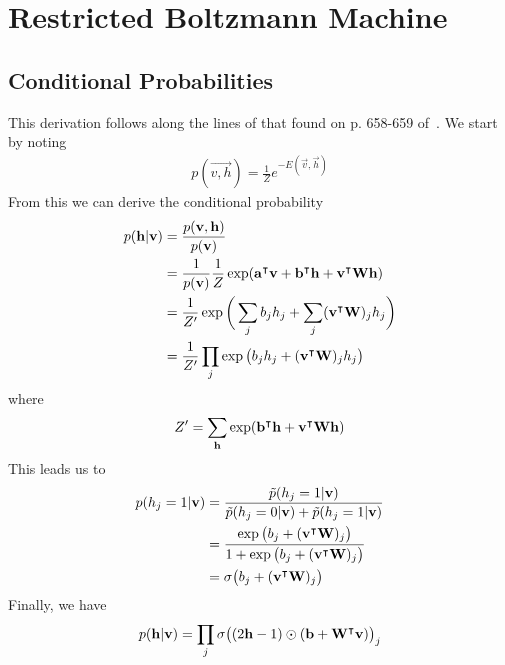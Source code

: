 \section{Restricted Boltzmann Machine}
\subsection{Conditional Probabilities}\label{app:conditional_probabilities_derivation}
This derivation follows along the lines of that found on p. 658-659 of~\cite{goodfellow_deep_learning}.
We start by noting
\begin{align}
    p(\vec{v,h}) = \frac{1}{Z} e^{-E(\vec{v},\vec{h})}
\end{align}
From this we can derive the conditional probability
\begin{align}
\begin{split}
    p(\mathbf{h} | \mathbf{v})
        &= \frac{p(\mathbf{v},\mathbf{h})}{p(\mathbf{v})} \\
        &= \frac{1}{p(\mathbf{v})} \frac{1}{Z} \exp( \mathbf{a}^\intercal\mathbf{v} + \mathbf{b}^\intercal\mathbf{h} + \mathbf{v}^\intercal\mathbf{W}\mathbf{h} ) \\
        &= \frac{1}{Z'} \exp\bigg( \sum_j b_j h_j + \sum_j (\mathbf{v}^\intercal\mathbf{W})_j h_j \bigg) \\
        &= \frac{1}{Z'} \prod_j \exp\big( b_j h_j + (\mathbf{v}^\intercal\mathbf{W})_j h_j \big)
\end{split}
\end{align}
where
\begin{align}
    Z' = \sum_{\mathbf{h}} \exp( \mathbf{b}^\intercal\mathbf{h} + \mathbf{v}^\intercal\mathbf{W}\mathbf{h} )
\end{align}
This leads us to
\begin{align}
\begin{split}
    p(h_j = 1 | \mathbf{v})
        &= \frac{\tilde{p}(h_j = 1 | \mathbf{v})}{\tilde{p}(h_j = 0 | \mathbf{v}) + \tilde{p}(h_j = 1 | \mathbf{v})} \\
        &= \frac{\exp\big( b_j + (\mathbf{v}^\intercal\mathbf{W})_j \big)}{1 + \exp\big( b_j + (\mathbf{v}^\intercal\mathbf{W})_j \big)} \\
        &= \sigma\big( b_j + (\mathbf{v}^\intercal\mathbf{W})_j \big)
\end{split}
\end{align}
Finally, we have
\begin{align}
    p(\mathbf{h} | \mathbf{v}) = \prod_j \sigma\big( (2\mathbf{h} - 1) \odot (\mathbf{b} + \mathbf{W}^\intercal\mathbf{v}) \big)_j
\end{align}

